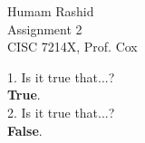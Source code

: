 \documentclass{scrartcl}
\begin{document}
\begin{flushleft}

    Humam Rashid\\
    Assignment 2\\
    CISC 7214X, Prof. Cox\\
    \bigskip

    1. Is it true that...?\\
    \bigskip
    \textbf{True}.\\
    \bigskip
    2. Is it true that...?\\
    \bigskip
    \textbf{False}.\\

    
\end{flushleft}
\end{document}
